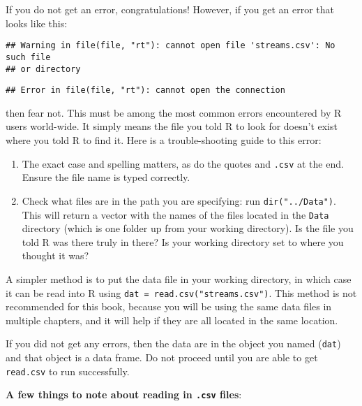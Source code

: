 \documentclass[]{book}
\providecommand{\tightlist}{%
  \setlength{\itemsep}{0pt}\setlength{\parskip}{0pt}}
\begin{document}
If you do not get an error, congratulations! However, if you get an error that looks like this:

\begin{verbatim}
## Warning in file(file, "rt"): cannot open file 'streams.csv': No such file
## or directory
\end{verbatim}

\begin{verbatim}
## Error in file(file, "rt"): cannot open the connection
\end{verbatim}

then fear not. This must be among the most common errors encountered by R users world-wide. It simply means the file you told R to look for doesn't exist where you told R to find it. Here is a trouble-shooting guide to this error:

\begin{enumerate}
\def\labelenumi{\arabic{enumi}.}
\tightlist
\item
  The exact case and spelling matters, as do the quotes and \texttt{.csv} at the end. Ensure the file name is typed correctly.
\item
  Check what files are in the path you are specifying: run \texttt{dir("../Data")}. This will return a vector with the names of the files located in the \texttt{Data} directory (which is one folder up from your working directory). Is the file you told R was there truly in there? Is your working directory set to where you thought it was?
\end{enumerate}

A simpler method is to put the data file in your working directory, in which case it can be read into R using \texttt{dat\ =\ read.csv("streams.csv")}. This method is not recommended for this book, because you will be using the same data files in multiple chapters, and it will help if they are all located in the same location.

If you did not get any errors, then the data are in the object you named (\texttt{dat}) and that object is a data frame. Do not proceed until you are able to get \texttt{read.csv} to run successfully.

\textbf{A few things to note about reading in \texttt{.csv} files}:
\end{document}
